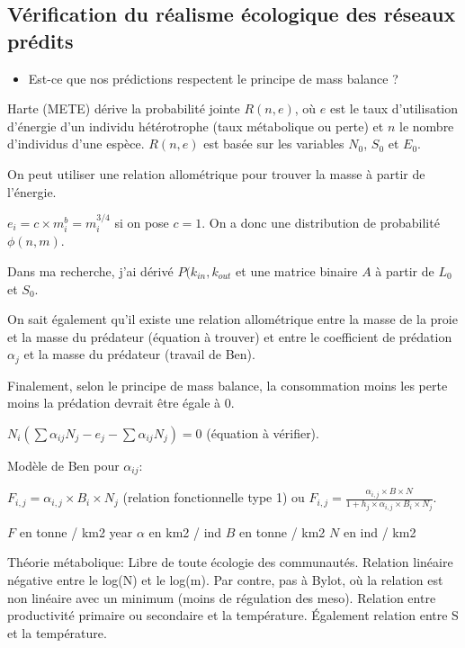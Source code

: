 \subsection{Vérification du réalisme écologique des réseaux prédits} 

\begin{itemize}
    \item Est-ce que nos prédictions respectent le principe de mass balance ?
\end{itemize}

Harte (METE) dérive la probabilité jointe $R(n, e)$, où $e$ est le taux
d'utilisation d'énergie d'un individu hétérotrophe (taux métabolique ou perte)
et $n$ le nombre d'individus d'une espèce. $R(n, e)$ est basée sur les variables
$N_0$, $S_0$ et $E_0$. 

On peut utiliser une relation allométrique pour trouver la masse à partir de
l'énergie. 

$e_i = c \times m_i^b = m_i^{3/4}$ si on pose $c = 1$. On a donc une
distribution de probabilité $\phi (n, m)$.

Dans ma recherche, j'ai dérivé $P(k_{in}, k_{out}$ et une matrice binaire $A$ à
partir de $L_0$ et $S_0$. 

On sait également qu'il existe une relation allométrique entre la masse de la
proie et la masse du prédateur (équation à trouver) et entre le coefficient de
prédation $\alpha_j$ et la masse du prédateur (travail de Ben). 

Finalement, selon le principe de mass balance, la consommation moins les perte
moins la prédation devrait être égale à 0. 

$N_i (\sum \alpha_{ij} N_j - e_j - \sum \alpha_{ij} N_j) = 0$ (équation à
vérifier). 

Modèle de Ben pour $\alpha_{ij}$:

$F_{i,j} = \alpha_{i,j} \times B_i \times N_j$ (relation fonctionnelle type 1)
ou $F_{i,j} = \frac{\alpha_{i,j} \times B \times N}{1 + h_j \times \alpha_{i,j}
\times B_i \times N_j}$. 

$F$ en tonne / km2 year $\alpha$ en km2 / ind $B$ en tonne / km2 $N$ en ind /
km2

Théorie métabolique: Libre de toute écologie des communautés. Relation linéaire négative entre le
log(N) et le log(m). Par contre, pas à Bylot, où la relation est non linéaire
avec un minimum (moins de régulation des meso). Relation entre productivité
primaire ou secondaire et la température. Également relation entre S et la
température. 


